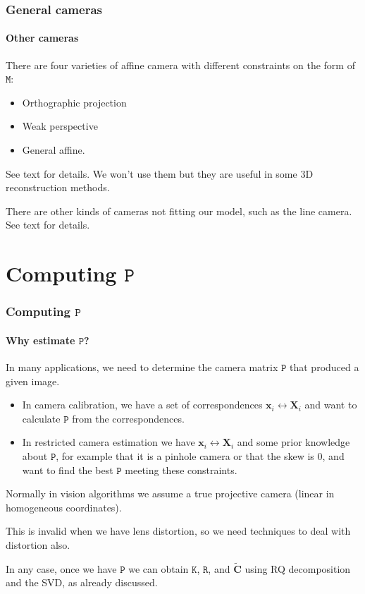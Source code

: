 \documentclass[aspectratio=169]{beamer}
\renewcommand{\vec}[1]{\boldsymbol{#1}}
\newcommand{\mat}[1]{\mathtt{#1}}
\begin{document}
\begin{frame}
\frametitle{General cameras}
\framesubtitle{Other cameras}

There are four varieties of affine camera with different constraints
on the form of $\mat{M}$:
\begin{itemize}
\item Orthographic projection
\item Weak perspective
\item General affine.
\end{itemize}
See text for details.  We won't use them but they are useful in some
3D reconstruction methods.

\medskip

There are other kinds of cameras not fitting our model, such as the
line camera.  See text for details.

\end{frame}

\section{Computing $\mat{P}$}

\begin{frame}
\frametitle{Computing $\mat{P}$}
\framesubtitle{Why estimate $\mat{P}$?}

In many applications, we need to determine the camera matrix $\mat{P}$
that produced a given image.
\begin{itemize}
\item In \alert{camera calibration}, we have a set of correspondences
  $\vec{x}_i \leftrightarrow \vec{X}_i$ and want to calculate
  $\mat{P}$ from the correspondences.
\item In \alert{restricted camera estimation} we have $\vec{x}_i
  \leftrightarrow \vec{X}_i$ and some prior knowledge about $\mat{P}$,
  for example that it is a pinhole camera or that the skew is 0, and
  want to find the best $\mat{P}$ meeting these constraints.
\end{itemize}

\medskip

Normally in vision algorithms we assume a true projective camera
(linear in homogeneous coordinates).

\medskip

This is invalid when we have \alert{lens distortion}, so we need
techniques to deal with distortion also.

\medskip

In any case, once we have $\mat{P}$ we can obtain $\mat{K}$,
$\mat{R}$, and $\tilde{\vec{C}}$ using RQ decomposition and the SVD,
as already discussed.

\end{frame}
\end{document}
